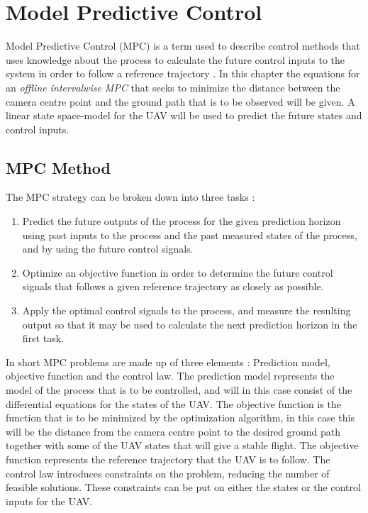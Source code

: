\chapter{Model Predictive Control}
\label{ch:optimization}

Model Predictive Control (MPC) is a term used to describe control methods that uses knowledge about the process to calculate the future control inputs to the system in order to follow a reference trajectory \cite{mpcCAMACHO}. In this chapter the equations for an \textit{offline intervalwise MPC} that seeks to minimize the distance between the camera centre point and the ground path that is to be observed will be given. A linear state space-model for the UAV will be used to predict the future states and control inputs.


\section{MPC Method}

The MPC strategy can be broken down into three tasks \cite{mpcCAMACHO}:

\begin{enumerate}
	\item Predict the future outputs of the process for the given prediction horizon using past inputs to the process and the past measured states of the process, and by using the future control signals.
	\item Optimize an objective function in order to determine the future control signals that follows a given reference trajectory as closely as possible.
	\item Apply the optimal control signals to the process, and measure the resulting output so that it may be used to calculate the next prediction horizon in the first task.
\end{enumerate}

In short MPC problems are made up of three elements \cite{mpcCAMACHO}: Prediction model, objective function and the control law. The prediction model represents the model of the process that is to be controlled, and will in this case consist of the differential equations for the states of the UAV. The objective function is the function that is to be minimized by the optimization algorithm, in this case this will be the distance from the camera centre point to the desired ground path together with some of the UAV states that will give a stable flight. The objective function represents the reference trajectory that the UAV is to follow. The control law introduces constraints on the problem, reducing the number of feasible solutions. These constraints can be put on either the states or the control inputs for the UAV.

